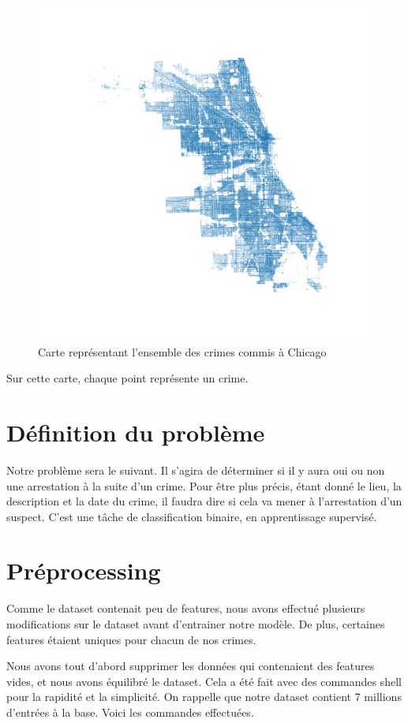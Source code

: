 \documentclass{article}
\begin{document}
\begin{figure}[H]
	    \includegraphics[scale=.2]{Images/carte_chicago.png}
	    \caption{Carte représentant l'ensemble des crimes commis à Chicago}
    \end{figure}
    Sur cette carte, chaque point représente un crime.

    \section{Définition du problème}
    Notre problème sera le suivant. Il s'agira de déterminer si il y aura
    oui ou non une arrestation à la suite d'un crime. 
    Pour être plus précis, étant donné le lieu, la description et la date du crime, 
    il faudra dire si cela va mener à l'arrestation d'un suspect.
    C'est une tâche de classification
    binaire, en apprentissage supervisé.

    \section{Préprocessing}
    Comme le dataset contenait peu de features, 
    nous avons effectué plusieurs modifications sur le dataset 
    avant d'entrainer notre modèle.
    De plus, certaines features étaient uniques pour chacun de nos crimes.

    Nous avons tout d'abord supprimer les données qui contenaient des features vides,
    et nous avons
    équilibré le dataset.
    Cela a été fait avec des commandes shell pour la rapidité et la simplicité. 
    On rappelle que notre dataset contient 7 millions d'entrées à la base.
    Voici les commandes effectuées.
\end{document}
